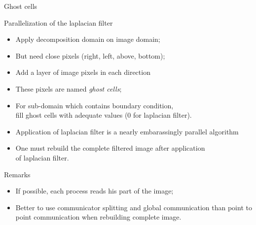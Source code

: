 \documentclass[compress,10pt,aspectratio=169]{beamer}
\begin{document}
\begin{frame}[fragile]{Ghost cells}
  \scriptsize
  \begin{multicols}{2}
  \begin{block}{\small Parallelization of the laplacian filter}
    \begin{itemize}
    \item Apply decomposition domain on image domain;
    \item But need close pixels (right, left, above, bottom);
    \item Add a layer of image pixels in each direction
    \item These pixels are named \textsl{ghost cells};
    \item For sub-domain which contains boundary condition,\\
      fill ghost cells with adequate values (0 for laplacian filter).
    \item Application of laplacian filter is a nearly embarassingly parallel algorithm
    \item One must rebuild the complete filtered image after application \\ of laplacian filter.
    \end{itemize}
  \end{block}

  \begin{alertblock}{\small Remarks}
    \begin{itemize}
    \item \alert{If possible}, each process reads his part of the image;
    \item Better to use communicator splitting and global communication than point to point communication
      when rebuilding complete image.
    \end{itemize}
  \end{alertblock}
  
  \begin{center}
\end{center}
\end{multicols}
\end{frame}
\end{document}
